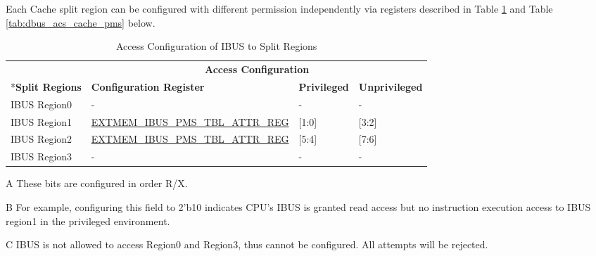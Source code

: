 \documentclass[main\_\_EN.tex]{subfiles}
\begin{document}
Each Cache split region can be configured with different permission independently via registers described in Table \ref{tab:ibus_acs_cache_pms} and Table \ref{tab:dbus_acs_cache_pms} below.

\begin{table}[H]
    \centering
    \caption{Access Configuration of IBUS to Split Regions}
    \label{tab:ibus_acs_cache_pms}
    \begin{threeparttable}
    \begin{tabular}{ | l | l | l | l |}
    \hline
        \rowcolor{lightgray}
         & \multicolumn{3}{c|}{\textbf{Access Configuration}} \\\cline{2-4}
        \rowcolor{lightgray}
        \multirow{-2}*{\textbf{Split Regions}} & \textbf{Configuration Register} & \textbf{Privileged}\tnote{A} & \textbf{Unprivileged}\tnote{A}\\\hline
        IBUS Region0\tnote{C}  & - & - & -\\\hline
        IBUS Region1  & \hyperref[regdesc:EXTMEMIBUSPMSTBLATTRREG]{EXTMEM\_IBUS\_PMS\_TBL\_ATTR\_REG} & [1:0]\tnote{B} & [3:2]\\\hline
        IBUS Region2  & \hyperref[regdesc:EXTMEMIBUSPMSTBLATTRREG]{EXTMEM\_IBUS\_PMS\_TBL\_ATTR\_REG} & [5:4] & [7:6]\\\hline
        IBUS Region3 \tnote{C} & - & - & -\\\hline
    \end{tabular}
    \begin{tablenotes}
        \item[A] These bits are configured in order R/X.
        \item[B] For example, configuring this field to 2'b10 indicates CPU's IBUS is granted read access but no instruction execution access to IBUS region1 in the privileged environment.
        \item[C] IBUS is not allowed to access Region0 and Region3, thus cannot be configured. All attempts will be rejected.
        \end{tablenotes}
    \end{threeparttable}
\end{table}
\end{document}
